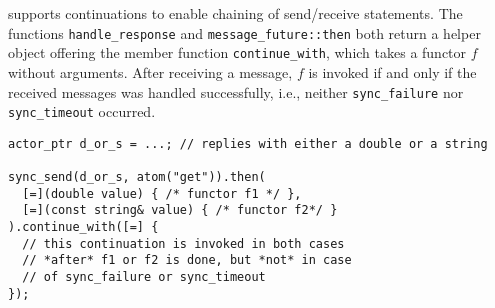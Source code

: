 \libcppa supports continuations to enable chaining of send/receive statements.
The functions \lstinline^handle_response^ and \lstinline^message_future::then^ both return a helper object offering the member function \lstinline^continue_with^, which takes a functor $f$ without arguments.
After receiving a message, $f$ is invoked if and only if the received messages was handled successfully, i.e., neither \lstinline^sync_failure^ nor \lstinline^sync_timeout^ occurred.

\begin{lstlisting}
actor_ptr d_or_s = ...; // replies with either a double or a string

sync_send(d_or_s, atom("get")).then(
  [=](double value) { /* functor f1 */ },
  [=](const string& value) { /* functor f2*/ }
).continue_with([=] {
  // this continuation is invoked in both cases
  // *after* f1 or f2 is done, but *not* in case
  // of sync_failure or sync_timeout
});
\end{lstlisting}

